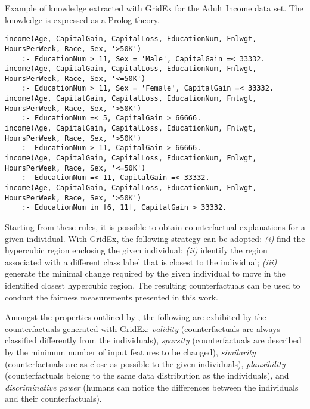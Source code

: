 \documentclass[letterpaper]{article} %
\begin{document}
\begin{listing*}[t!]
	\caption{Example of knowledge extracted with GridEx for the Adult Income data set. The knowledge is expressed as a Prolog theory.}\label{lst:rules}
	\begin{lstlisting}[]
income(Age, CapitalGain, CapitalLoss, EducationNum, Fnlwgt, HoursPerWeek, Race, Sex, '>50K') 
    :- EducationNum > 11, Sex = 'Male', CapitalGain =< 33332.
income(Age, CapitalGain, CapitalLoss, EducationNum, Fnlwgt, HoursPerWeek, Race, Sex, '<=50K') 
    :- EducationNum > 11, Sex = 'Female', CapitalGain =< 33332.
income(Age, CapitalGain, CapitalLoss, EducationNum, Fnlwgt, HoursPerWeek, Race, Sex, '>50K') 
    :- EducationNum =< 5, CapitalGain > 66666.
income(Age, CapitalGain, CapitalLoss, EducationNum, Fnlwgt, HoursPerWeek, Race, Sex, '>50K') 
    :- EducationNum > 11, CapitalGain > 66666.
income(Age, CapitalGain, CapitalLoss, EducationNum, Fnlwgt, HoursPerWeek, Race, Sex, '<=50K') 
    :- EducationNum =< 11, CapitalGain =< 33332.
income(Age, CapitalGain, CapitalLoss, EducationNum, Fnlwgt, HoursPerWeek, Race, Sex, '>50K') 
    :- EducationNum in [6, 11], CapitalGain > 33332.
	\end{lstlisting}
\end{listing*}

Starting from these rules, it is possible to obtain counterfactual explanations for a given individual. With GridEx, the following strategy can be adopted: \textit{(i)} find the hypercubic region enclosing the given individual; \textit{(ii)} identify the region associated with a different class label that is closest to the individual; \textit{(iii)} generate the minimal change required by the given individual to move in the identified closest hypercubic region.
%
The resulting counterfactuals can be used to conduct the fairness measurements presented in this work.

Amongst the properties outlined by \citet{guidotti2022counterfactual}, the following are exhibited by the counterfactuals generated with GridEx: \textit{validity} (counterfactuals are always classified differently from the individuals), \textit{sparsity} (counterfactuals are described by the minimum number of input features to be changed), \textit{similarity} (counterfactuals are as close as possible to the given individuals), \textit{plausibility} (counterfactuals belong to the same data distribution as the individuals), and \textit{discriminative power} (humans can notice the differences between the individuals and their counterfactuals).%
\end{document}
